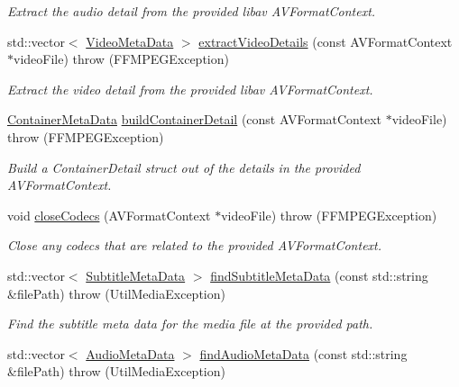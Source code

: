 \begin{DoxyCompactItemize}
\begin{DoxyCompactList}\small\item\em Extract the audio detail from the provided libav AVFormatContext. \item\end{DoxyCompactList}\item 
std::vector$<$ \hyperlink{structtranscode_1_1VideoMetaData}{VideoMetaData} $>$ \hyperlink{namespacetranscode_1_1util_a5755318eb50f620cdc071c7ad23cfff7}{extractVideoDetails} (const AVFormatContext $\ast$videoFile)  throw (FFMPEGException)
\begin{DoxyCompactList}\small\item\em Extract the video detail from the provided libav AVFormatContext. \item\end{DoxyCompactList}\item 
\hyperlink{structtranscode_1_1ContainerMetaData}{ContainerMetaData} \hyperlink{namespacetranscode_1_1util_a38d01175f2cce57e6578e5e46cb385e0}{buildContainerDetail} (const AVFormatContext $\ast$videoFile)  throw (FFMPEGException)
\begin{DoxyCompactList}\small\item\em Build a ContainerDetail struct out of the details in the provided AVFormatContext. \item\end{DoxyCompactList}\item 
void \hyperlink{namespacetranscode_1_1util_ac6274ea5d31808dd2930981770a3946b}{closeCodecs} (AVFormatContext $\ast$videoFile)  throw (FFMPEGException)
\begin{DoxyCompactList}\small\item\em Close any codecs that are related to the provided AVFormatContext. \item\end{DoxyCompactList}\item 
std::vector$<$ \hyperlink{structtranscode_1_1SubtitleMetaData}{SubtitleMetaData} $>$ \hyperlink{namespacetranscode_1_1util_a90c8a8e7393c1d9f8db003a2cad1efba}{findSubtitleMetaData} (const std::string \&filePath)  throw (UtilMediaException)
\begin{DoxyCompactList}\small\item\em Find the subtitle meta data for the media file at the provided path. \item\end{DoxyCompactList}\item 
std::vector$<$ \hyperlink{structtranscode_1_1AudioMetaData}{AudioMetaData} $>$ \hyperlink{namespacetranscode_1_1util_ad4c7b1a0e312ed159481b9ce476aae6f}{findAudioMetaData} (const std::string \&filePath)  throw (UtilMediaException)

\end{DoxyCompactItemize}
